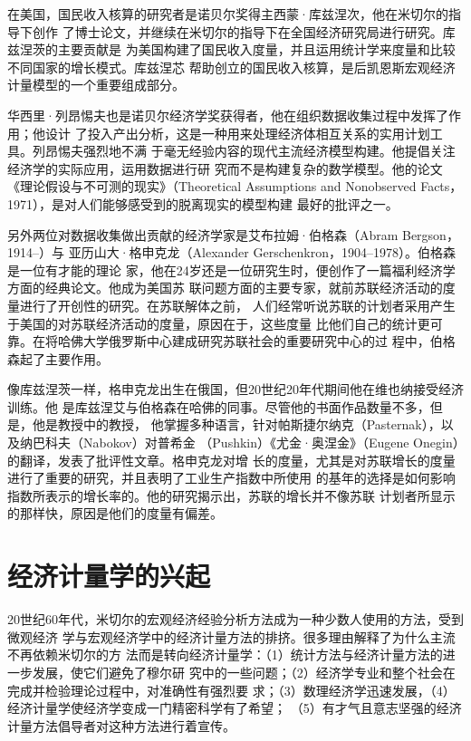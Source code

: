在美国，国民收入核算的研究者是诺贝尔奖得主西蒙·库兹涅次，他在米切尔的指导下创作
了博士论文，并继续在米切尔的指导下在全国经济研究局进行研究。库兹涅茨的主要贡献是
为美国构建了国民收入度量，并且运用统计学来度量和比较不同国家的增长模式。库兹涅芯
帮助创立的国民收入核算，是后凯恩斯宏观经济计量模型的一个重要组成部分。

华西里·列昂惕夫也是诺贝尔经济学奖获得者，他在组织数据收集过程中发挥了作用；他设计
了投入产出分析，这是一种用来处理经济体相互关系的实用计划工具。列昂惕夫强烈地不满
于毫无经验内容的现代主流经济模型构建。他提倡关注经济学的实际应用，运用数据进行研
究而不是构建复杂的数学模型。他的论文《理论假设与不可测的现实》（Theoretical
Assumptions and Nonobserved Facts，1971），是对人们能够感受到的脱离现实的模型构建
最好的批评之一。

另外两位对数据收集做出贡献的经济学家是艾布拉姆·伯格森（Abram Bergson，1914--）与
亚历山大·格申克龙（Alexander Gerschenkron，1904--1978）。伯格森是一位有才能的理论
家，他在24岁还是一位研究生时，便创作了一篇福利经济学方面的经典论文。他成为美国苏
联问题方面的主要专家，就前苏联经济活动的度量进行了开创性的研究。在苏联解体之前，
人们经常听说苏联的计划者采用产生于美国的对苏联经济活动的度量，原因在于，这些度量
比他们自己的统计更可靠。在将哈佛大学俄罗斯中心建成研究苏联社会的重要研究中心的过
程中，伯格森起了主要作用。

像库兹涅茨一样，格申克龙出生在俄国，但20世纪20年代期间他在维也纳接受经济训练。他
是库兹涅艾与伯格森在哈佛的同事。尽管他的书面作品数量不多，但是，他是教授中的教授，
他掌握多种语言，针对帕斯捷尔纳克（Pasternak），以及纳巴科夫（Nabokov）对普希金
（Pushkin）《尤金·奥涅金》（Eugene Onegin）的翻译，发表了批评性文章。格申克龙对增
长的度量，尤其是对苏联增长的度量进行了重要的研究，并且表明了工业生产指数中所使用
的基年的选择是如何影响指数所表示的增长率的。他的研究揭示出，苏联的增长并不像苏联
计划者所显示的那样快，原因是他们的度量有偏差。

\section{经济计量学的兴起}

20世纪60年代，米切尔的宏观经济经验分析方法成为一种少数人使用的方法，受到微观经济
学与宏观经济学中的经济计量方法的排挤。很多理由解释了为什么主流不再依赖米切尔的方
法而是转向经济计量学：（1）统计方法与经济计量方法的进一步发展，使它们避免了穆尔研
究中的一些问题；（2）经济学专业和整个社会在完成并检验理论过程中，对准确性有强烈要
求；（3）数理经济学迅速发展，（4）经济计量学使经济学变成一门精密科学有了希望；
（5）有才气且意志坚强的经济计量方法倡导者对这种方法进行着宣传。

